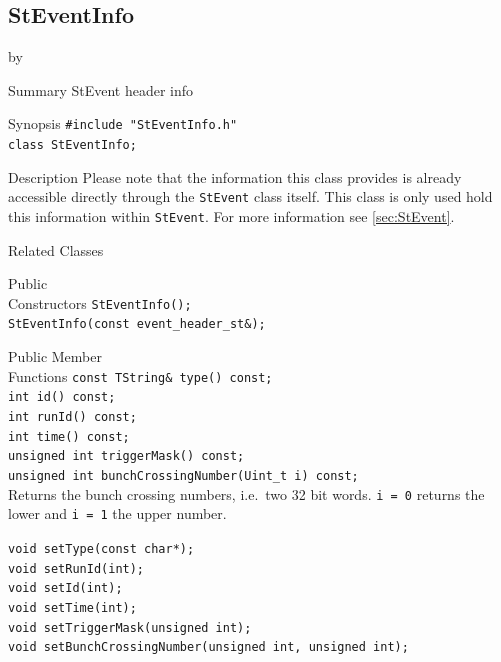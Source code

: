 \documentclass[twoside]{article}
\newcommand{\entrylabel}[1]{\mbox{\textbf{{#1}}}\hfil}%
\newenvironment{entry}
{\begin{list}{}%
    {\renewcommand{\makelabel}{\entrylabel}%
     \setlength{\labelwidth}{90pt}%
     \setlength{\leftmargin}{\labelwidth}
     \advance\leftmargin by \labelsep%
      }%
    }%
  {\end{list}}
\newcommand{\Entrylabel}[1]%
{\raisebox{0pt}[1ex][0pt]{\makebox[\labelwidth][l]%
    {\parbox[t]{\labelwidth}{\hspace{0pt}\textbf{{#1}}}}}}
\newenvironment{Entry}%
{\renewcommand{\entrylabel}{\Entrylabel}\begin{entry}}%
  {\end{entry}}
\begin{document}
\subsection{StEventInfo}
\label{sec:StEventInfo}
\begin{Entry}
\item[Summary] StEvent header info

\item[Synopsis]
    \verb+#include "StEventInfo.h"+\\
    \verb+class StEventInfo;+\\

\item[Description] Please note that the information this class provides
    is already accessible directly through the \texttt{StEvent} class
    itself. This class is only used hold this information within
    \texttt{StEvent}. For more information see \ref{sec:StEvent}.

\item[Related Classes]
\item[Public\\ Constructors]
    \verb+StEventInfo();+\\
    \verb+StEventInfo(const event_header_st&);+\\
\item[Public Member\\ Functions]
    \verb+const TString& type() const;+\\
    \verb+int id() const;+\\
    \verb+int runId() const;+\\
    \verb+int time() const;+\\
    \verb+unsigned int triggerMask() const;+\\

    \verb+unsigned int bunchCrossingNumber(Uint_t i) const;+\\
    Returns the bunch crossing numbers, i.e.~two 32 bit words.
    \texttt{i = 0} returns the lower and \texttt{i = 1} the upper number.

    \verb+void setType(const char*);+\\
    \verb+void setRunId(int);+\\
    \verb+void setId(int);+\\
    \verb+void setTime(int);+\\
    \verb+void setTriggerMask(unsigned int);+\\
    \verb+void setBunchCrossingNumber(unsigned int, unsigned int);+\\
\end{Entry}
\clearpage
\end{document}
